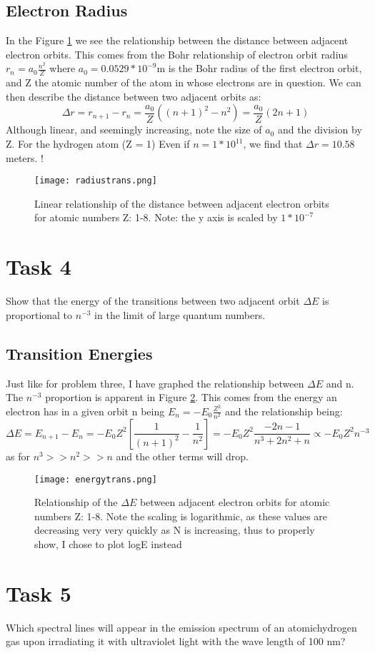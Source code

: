 \documentclass{article}
\begin{document}
\subsection*{Electron Radius}
In the Figure \ref{radiustrans} we see the relationship between the distance between adjacent electron orbits. This comes from the Bohr relationship of electron orbit radius $r_n = a_0 \frac{n^2}{Z}$ where $a_0 = 0.0529*10^{-9}$m is the Bohr radius of the first electron orbit, and Z the atomic number of the atom in whose electrons are in question. We can then describe the distance between two adjacent orbits as: $$\Delta r = r_{n+1} - r_{n} = \frac{a_0}{Z}((n+1)^2 - n^2) = \frac{a_0}{Z}(2n +1)$$
Although linear, and seemingly increasing, note the size of $a_0$ and the division by Z. For the hydrogen atom (Z = 1) Even if $n =1*10^{11} $, we find that $\Delta r = 10.58$ meters. !

\begin{figure}
      \centering
      \caption{Linear relationship of the distance between adjacent electron orbits for atomic numbers Z: 1-8. Note: the y axis is scaled by $1*10^{-7}$}
      \texttt{[image: radiustrans.png]}
      \label{radiustrans}

\end{figure}

\section{Task 4}
Show that the energy of the transitions between two adjacent orbit $\Delta E$ is proportional to $n^{-3}$ in the limit of large quantum numbers.
\subsection*{Transition Energies}
Just like for problem three, I have graphed the relationship between $\Delta E$ and n. The $n^{-3}$ proportion is apparent in Figure \ref{energytrans}. This comes from the energy an electron has in a given orbit n being $E_n = -E_0 \frac{Z^2}{n^2}$ and the relationship being:
$$\Delta E = E_{n+1} - E_n = -E_0 Z^2 [\frac{1}{(n+1)^2} - \frac{1}{n^2}] =  -E_0 Z^2 \frac{-2n -1}{n^3 + 2n^2 + n} \propto -E_0Z^2 n^{-3}$$ as for $n^3 >> n^2 >> n$ and the other terms will drop.

\begin{figure}
      \centering
      \caption{Relationship of the $\Delta E$ between adjacent electron orbits for atomic numbers Z: 1-8. Note the scaling is logarithmic, as these values are decreasing very very quickly as N is increasing, thus to properly show, I chose to plot logE instead}
      \texttt{[image: energytrans.png]}
      \label{energytrans}

\end{figure}


\section{Task 5}
Which spectral lines will appear in the emission spectrum of an atomichydrogen gas upon irradiating it with ultraviolet light with the wave length of 100 nm?
\end{document}
